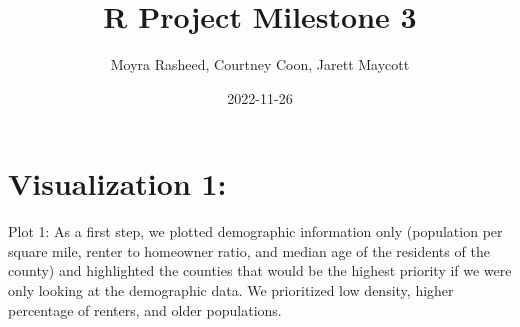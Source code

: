 \documentclass[
]{article}
\title{R Project Milestone 3}
\author{Moyra Rasheed, Courtney Coon, Jarett Maycott}
\date{2022-11-26}
\begin{document}
\maketitle

\hypertarget{visualization-1}{%
\section{Visualization 1:}\label{visualization-1}}

Plot 1: As a first step, we plotted demographic information only
(population per square mile, renter to homeowner ratio, and median age
of the residents of the county) and highlighted the counties that would
be the highest priority if we were only looking at the demographic data.
We prioritized low density, higher percentage of renters, and older
populations.
\end{document}
